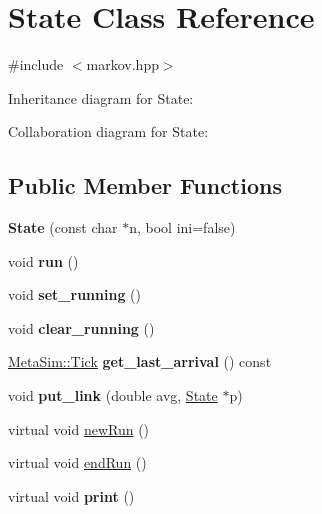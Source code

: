 \hypertarget{classState}{}\section{State Class Reference}
\label{classState}


{\ttfamily \#include $<$markov.\+hpp$>$}



Inheritance diagram for State\+:


Collaboration diagram for State\+:
\subsection*{Public Member Functions}
\begin{DoxyCompactItemize}
\item 
{\bfseries State} (const char $\ast$n, bool ini=false)\hypertarget{classState_ae40176691bb2c15a36948fb0368f8132}{}\label{classState_ae40176691bb2c15a36948fb0368f8132}

\item 
void {\bfseries run} ()\hypertarget{classState_a6e167160b4823e97d790578065f509d9}{}\label{classState_a6e167160b4823e97d790578065f509d9}

\item 
void {\bfseries set\+\_\+running} ()\hypertarget{classState_aba74326efaf6424c255b0aa19e2f7875}{}\label{classState_aba74326efaf6424c255b0aa19e2f7875}

\item 
void {\bfseries clear\+\_\+running} ()\hypertarget{classState_a286bf4adc9e25e49620423e529427f44}{}\label{classState_a286bf4adc9e25e49620423e529427f44}

\item 
\hyperlink{classMetaSim_1_1Tick}{Meta\+Sim\+::\+Tick} {\bfseries get\+\_\+last\+\_\+arrival} () const \hypertarget{classState_a1ff6163f1418bbff6f9bd731a66d0daa}{}\label{classState_a1ff6163f1418bbff6f9bd731a66d0daa}

\item 
void {\bfseries put\+\_\+link} (double avg, \hyperlink{classState}{State} $\ast$p)\hypertarget{classState_a3fb2e64a7f16b9a33f5794ba93035638}{}\label{classState_a3fb2e64a7f16b9a33f5794ba93035638}

\item 
virtual void \hyperlink{classState_a8761f5b93680e53fefbb5d930ded276e}{new\+Run} ()
\item 
virtual void \hyperlink{classState_a569901a3ee19147755f07b07fccdb343}{end\+Run} ()
\item 
virtual void {\bfseries print} ()\hypertarget{classState_a7f87423f14baecc25b8d2a70f1db554b}{}\label{classState_a7f87423f14baecc25b8d2a70f1db554b}

\end{DoxyCompactItemize}
